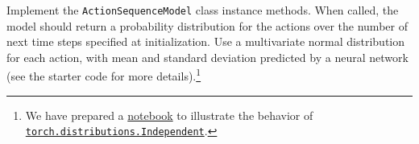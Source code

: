 \item {}

Implement the \texttt{ActionSequenceModel} class instance methods. When called, the model should return a probability distribution for the actions over the number of next time steps specified at initialization. Use a multivariate normal distribution for each action, with mean and standard deviation predicted by a neural network (see the starter code for more details).\footnote{We have prepared a \href{https://colab.research.google.com/drive/1sw8FJIR5865laTJiI0fqHG3KcGVT23ED}{notebook} to illustrate the behavior of \href{https://pytorch.org/docs/stable/distributions.html\#independent}{\texttt{torch.distributions.Independent}}.}